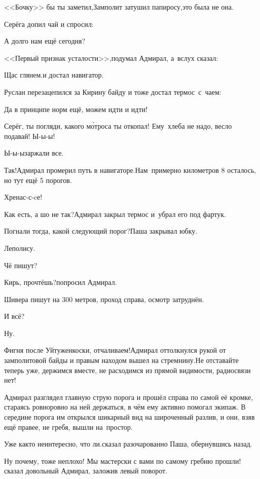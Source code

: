 \diagdash <<Бочку>> бы ты заметил,\mdash Замполит затушил папиросу,\mdash это была не она.

Серёга допил чай и спросил:

\diagdash А долго нам ещё сегодня?

<<Первый признак усталости>>,\mdash подумал Адмирал, а~вслух сказал:

\diagdash Щас глянем.\mdash и достал навигатор.

Руслан перезацепился за Кирину байду и тоже достал термос~с~чаем:

\diagdash Да в принципе норм ещё, можем идти и идти!

\diagdash Серёг, ты погляди, какого м\'{о}троса ты откопал! Ему~хлеба не надо, весло подавай! Ы-ы-ы!

\diagdash Ы-ы-ы\mdash заржали все.

\diagdash Так!\mdash Адмирал промерил путь в навигаторе.\mdash Нам~примерно километров 8 осталось, но тут ещё 5 порогов.

\diagdash Хренас-с-cе!

\diagdash Как есть, а шо не так?\mdash Адмирал закрыл термос и~убрал его под фартук.

\diagdash Погнали тогда, какой следующий порог?\mdash Паша закрывал юбку.

\diagdash Леполису.

\diagdash Чё пишут?

\diagdash Кирь, прочтёшь?\mdash попросил Адмирал.

\diagdash Шивера пишут на 300 метров, проход справа, осмотр затруднён.

\diagdash И всё?

\diagdash Ну.

\diagdash Фигня после Уйтуженкоски, отчаливаем!\mdash Адмирал оттолкнулся рукой от замполитовой байды и правым находом вышел на стремнину.\mdash Не отставайте теперь уже, держимся вместе, не расходимся из прямой видимости, радиосвязи нет!

Адмирал разглядел главную струю порога и прошёл справа по самой её кромке, стараясь ровно\sdash ровно на ней держаться, в чём ему активно помогал экипаж. В середине порога им открылся шикарный вид на широченный разлив, и они, взяв ещё правее, не гребя, вышли на~простор.

\diagdash Уже как\sdash то неинтересно, что ли.\mdash сказал разочарованно Паша, обернувшись назад.

\diagdash Ну почему, тоже неплохо! Мы мастерски с вами по самому гребню прошли!\mdash сказал довольный Адмирал, заложив левый поворот.

